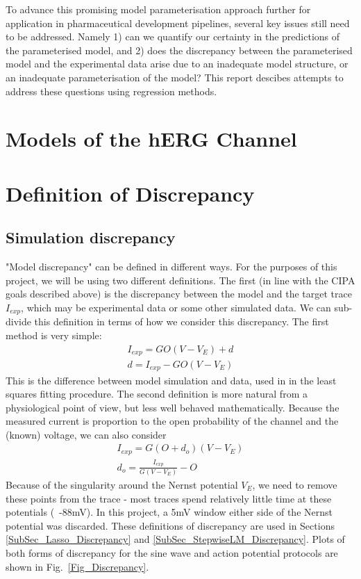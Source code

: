 \documentclass[11pt,a4paper,oneside]{article}
\begin{document}
To advance this promising model parameterisation approach further for application in pharmaceutical development pipelines, several key issues still need to be addressed. Namely 1) can we quantify our certainty in the predictions of the parameterised model, and 2) does the discrepancy between the parameterised model and the experimental data arise due to an inadequate model structure, or an inadequate parameterisation of the model? This report descibes attempts to address these questions using regression methods.

\section{Models of the hERG Channel} \label{}


\section{Definition of Discrepancy} \label{ModelsOfDiscrepancy}
\subsection{Simulation discrepancy}
"Model discrepancy" can be defined in different ways. For the purposes of this project, we will be using two different definitions. The first (in line with the CIPA goals described above) is the discrepancy between the model and the target trace $I_{exp}$, which may be experimental data or some other simulated data. We can sub-divide this definition in terms of how we consider this discrepancy. The first method is very simple:
\begin{align}
	I_{exp} = G O ( V - V_E ) + d\\
	d = I_{exp} - G O ( V - V_E )
\end{align}
This is the difference between model simulation and data, used in \cite{Beattie2018} in the least squares fitting procedure. The second definition is more natural from a physiological point of view, but less well behaved mathematically. Because the measured current is proportion to the open probability of the channel and the (known) voltage, we can also consider
\begin{align}
	I_{exp} = G ( O + d_o ) ( V - V_E )\\
	d_o = \frac{I_{exp} }{ G( V - V_E ) } - O
\end{align}
Because of the singularity around the Nernst potential $V_E$, we need to remove these points from the trace - most traces spend relatively little time at these potentials (~-88mV). In this project, a 5mV window either side of the Nernst potential was discarded. These definitions of discrepancy are used in Sections \ref{SubSec_Lasso_Discrepancy} and \ref{SubSec_StepwiseLM_Discrepancy}. Plots of both forms of discrepancy for the sine wave and action potential protocols are shown in Fig.~\ref{Fig_Discrepancy}.
\end{document}
